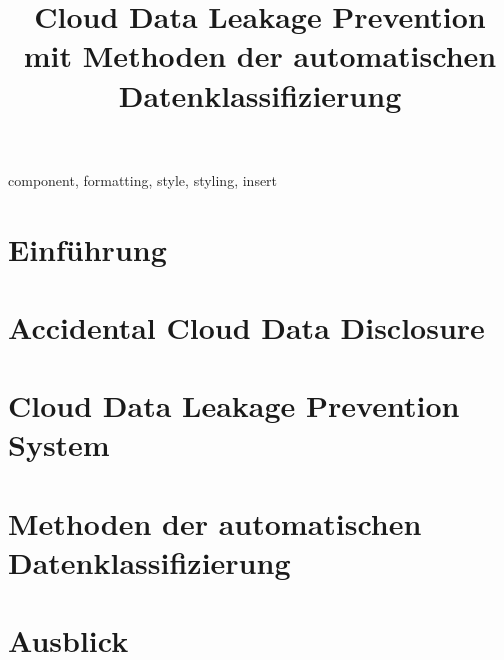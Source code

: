 \documentclass[conference]{IEEEtran}
\begin{document}
\title{Cloud Data Leakage Prevention mit Methoden der automatischen Datenklassifizierung}

\author{
}

\maketitle

\begin{abstract}
    
\end{abstract}

\begin{IEEEkeywords}
    component, formatting, style, styling, insert
\end{IEEEkeywords}

\section{Einführung}


\section{Accidental Cloud Data Disclosure} \label{threat-kapitel}


\section{Cloud Data Leakage Prevention System}


\section{Methoden der automatischen Datenklassifizierung}


\section{Ausblick}


\balance


\end{document}
